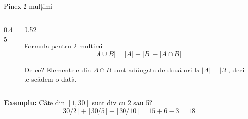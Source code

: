 \documentclass[10pt]{beamer}
\begin{document}
\begin{frame}{Pinex \textemdash{} 2 mulțimi}
  \begin{columns}[T]
    \begin{column}{0.45\textwidth}
      \begin{center}
      \end{center}
    \end{column}
    \begin{column}{0.52\textwidth}
      \begin{block}{Formula pentru 2 mulțimi}
        \[
          |A \cup B| = |A| + |B| - |A \cap B|
        \]
      \end{block}
      \smallskip
      De ce? Elementele din $A \cap B$ sunt adăugate de două ori la $|A|+|B|$,
      deci le scădem o dată.
    \end{column}
  \end{columns}
  \smallskip
  \textbf{Exemplu:} Câte din $[1,30]$ sunt div cu 2 sau 5?
  \[
    \lfloor 30/2 \rfloor + \lfloor 30/5 \rfloor - \lfloor 30/10 \rfloor
    = 15 + 6 - 3 = 18
  \]
\end{frame}
\end{document}
